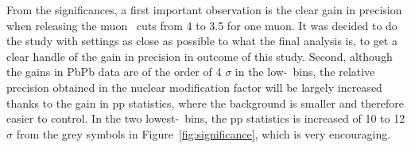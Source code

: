 From the significances, a first important observation is the clear
gain in precision when releasing the muon \pt\ cuts from 4 \GeVc to
3.5 \GeVc for one muon. It was decided to
do the study with settings as close as possible to what the final analysis
is, to get a clear handle of the gain in precision in outcome of this
study. Second, although the gains in PbPb data are of the order of 4
$\sigma$ in the low-\pt\ bins, the relative precision obtained in the
nuclear modification factor will be largely increased thanks to the
gain in pp statistics, where the background is smaller and therefore easier to
control. In the two lowest-\pt\ bins, the pp statistics is increased
of 10 to 12 $\sigma$ from the grey symbols in
Figure~\ref{fig:significance}, which is very encouraging. %



